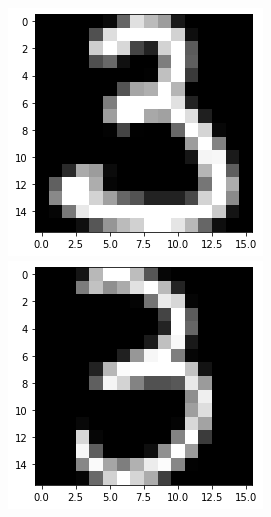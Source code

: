 \documentclass[a4paper,10pt]{report}
\begin{document}
\begin{figure}[!htb]
    \includegraphics[width=\linewidth]{3_1.png}
  \endminipage\hfill
    \includegraphics[width=\linewidth]{3_2.png}

\end{figure}
\end{document}

